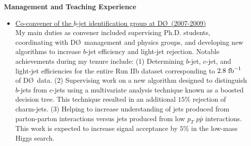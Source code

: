 \documentclass[12pt]{article}
\newcommand{\dzero}{D\O}
\begin{document}
\begin{singlespace}
\begin{itemize}
\end{itemize}
%


%
\clearpage

\noindent
{\Large \textbf{Management and Teaching Experience}}

\begin{itemize}
\item{\underline{Co-convener of the $b$-jet identification group at \dzero~(2007-2009)}\\My main duties as convener included supervising Ph.D. students, coordinating with \dzero~management and physics groups, and developing new algorithms to increase $b$-jet efficiency and light-jet rejection. Notable achievements during my tenure include: (1) Determining $b$-jet, $c$-jet, and light-jet efficiencies for the entire Run IIb dataset corresponding to $2.8~\rm{fb}^{-1}$ of \dzero~data. (2) Supervising work on a new algorithm designed to distinguish $b$-jets from $c$-jets using a multivariate analysis technique known as a boosted decision tree.  This technique resulted in an additional $15\%$ rejection of charm-jets.  (3) Helping to increase understanding of jets produced from parton-parton interactions versus jets produced from low $p_{T}$ $p\bar{p}$ interactions. This work is expected to increase signal acceptance by $5\%$ in the low-mass Higgs search.}


\end{itemize}
\end{singlespace}
\end{document}
